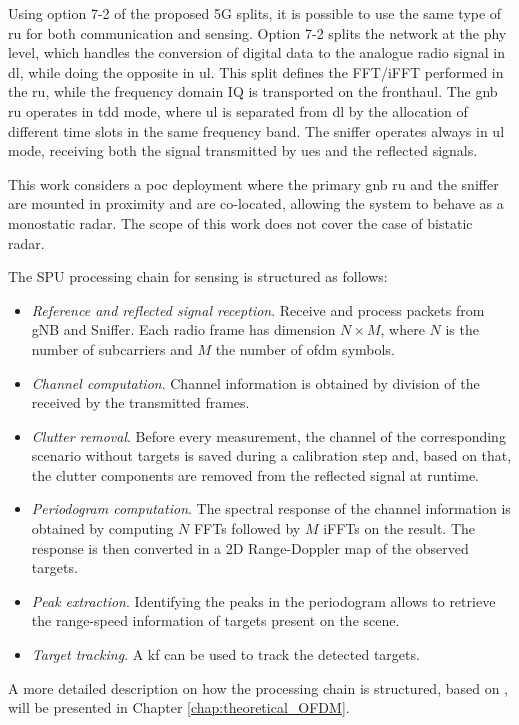 	Using option 7-2 of the proposed 5G splits, it is possible to use the same type of \gls{ru} for both communication and sensing.
	Option 7-2 splits the network at the \gls{phy} level, which handles the conversion of digital data to the analogue radio signal in \gls{dl}, while doing the opposite in \gls{ul}.
	This split defines the FFT/iFFT performed in the \gls{ru}, while the frequency domain IQ is transported on the fronthaul.
	The \gls{gnb} \gls{ru} operates in \gls{tdd} mode, where \gls{ul} is separated from \gls{dl} by the allocation of different time slots in the same frequency band. 	
	The sniffer operates always in \gls{ul} mode, receiving both the signal transmitted by \glspl{ue} and the reflected signals. 
	
	This work considers a \gls{poc} deployment where the primary \gls{gnb} \gls{ru} and the sniffer are mounted in proximity and are co-located, allowing the system to behave as a monostatic radar. 
	The scope of this work does not cover the case of bistatic radar.
	
	The SPU processing chain for sensing is structured as follows:
	
	\begin{itemize}
		\item \textit{Reference and reflected signal reception}. Receive and process packets from gNB and Sniffer. Each radio frame has dimension $N\times M$, where $N$ is the number of subcarriers and $M$ the number of \gls{ofdm} symbols.
		\item \textit{Channel computation}. Channel information is obtained by division of the received by the transmitted frames.
		\item \textit{Clutter removal}. Before every measurement, the channel of the corresponding scenario without targets is saved during a calibration step and, based on that, the clutter components are removed from the reflected signal at runtime.
		\item \textit{Periodogram computation}. The spectral response of the channel information is obtained by computing $N$ FFTs followed by $M$ iFFTs on the result. The response is then converted in a 2D Range-Doppler map of the observed targets. 
		\item \textit{Peak extraction}. Identifying the peaks in the periodogram allows to retrieve the range-speed information of targets present on the scene.
		\item \textit{Target tracking}. A \gls{kf} can be used to track the detected targets. 
	\end{itemize} 
	A more detailed description on how the processing chain is structured,  based on \cite{Braun2014OFDMRA}, will be presented in Chapter \ref{chap:theoretical_OFDM}.
	
